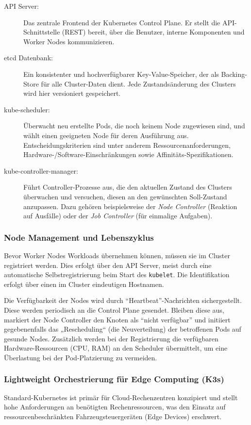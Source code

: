 \begin{description}
    \item[API Server:] Das zentrale Frontend der Kubernetes Control Plane. Er stellt die API-Schnittstelle (REST) bereit, über die Benutzer, interne Komponenten und Worker Nodes kommunizieren.
    \item[etcd Datenbank:] Ein konsistenter und hochverfügbarer Key-Value-Speicher, der als Backing-Store für alle Cluster-Daten dient. Jede Zustandsänderung des Clusters wird hier versioniert gespeichert.
    \item[kube-scheduler:] Überwacht neu erstellte Pods, die noch keinem Node zugewiesen sind, und wählt einen geeigneten Node für deren Ausführung aus. Entscheidungskriterien sind unter anderem Ressourcenanforderungen, Hardware-/Software-Einschränkungen sowie Affinitäts-Spezifikationen.
    \item[kube-controller-manager:] Führt Controller-Prozesse aus, die den aktuellen Zustand des Clusters überwachen und versuchen, diesen an den gewünschten Soll-Zustand anzupassen. Dazu gehören beispielsweise der \textit{Node Controller} (Reaktion auf Ausfälle) oder der \textit{Job Controller} (für einmalige Aufgaben).
\end{description}

\subsubsection{Node Management und Lebenszyklus}
Bevor Worker Nodes Workloads übernehmen können, müssen sie im Cluster registriert werden. Dies erfolgt über den API Server, meist durch eine automatische Selbstregistrierung beim Start des \texttt{kubelet}. Die Identifikation erfolgt über einen im Cluster eindeutigen Hostnamen.

Die Verfügbarkeit der Nodes wird durch \enquote{Heartbeat}-Nachrichten sichergestellt. Diese werden periodisch an die Control Plane gesendet. Bleiben diese aus, markiert der Node Controller den Knoten als \enquote{nicht verfügbar} und initiiert gegebenenfalls das „Rescheduling“ (die Neuverteilung) der betroffenen Pods auf gesunde Nodes. Zusätzlich werden bei der Registrierung die verfügbaren Hardware-Ressourcen (CPU, RAM) an den Scheduler übermittelt, um eine Überlastung bei der Pod-Platzierung zu vermeiden.

\subsubsection{Lightweight Orchestrierung für Edge Computing (K3s)}
Standard-Kubernetes ist primär für Cloud-Rechenzentren konzipiert und stellt hohe Anforderungen an benötigten Rechenressourcen, was den Einsatz auf ressourcenbeschränkten Fahrzeugsteuergeräten (Edge Devices) erschwert. 

